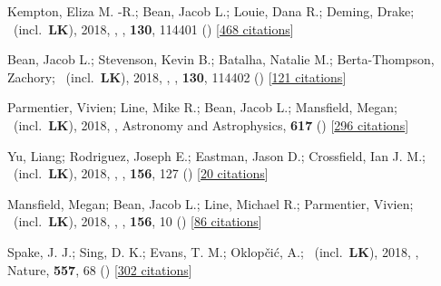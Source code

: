 \item[{\color{numcolor}\scriptsize24}] Kempton, Eliza M. -R.; Bean, Jacob L.; Louie, Dana R.; Deming, Drake; \etal\ (incl.\ \textbf{LK}), 2018, , \pasp, \textbf{130}, 114401 () [\href{https://ui.adsabs.harvard.edu/abs/2018PASP..130k4401K}{468 citations}]

\item[{\color{numcolor}\scriptsize23}] Bean, Jacob L.; Stevenson, Kevin B.; Batalha, Natalie M.; Berta-Thompson, Zachory; \etal\ (incl.\ \textbf{LK}), 2018, , \pasp, \textbf{130}, 114402 () [\href{https://ui.adsabs.harvard.edu/abs/2018PASP..130k4402B}{121 citations}]

\item[{\color{numcolor}\scriptsize22}] Parmentier, Vivien; Line, Mike R.; Bean, Jacob L.; Mansfield, Megan; \etal\ (incl.\ \textbf{LK}), 2018, , Astronomy and Astrophysics, \textbf{617} () [\href{https://ui.adsabs.harvard.edu/abs/2018A&A...617A.110P}{296 citations}]

\item[{\color{numcolor}\scriptsize21}] Yu, Liang; Rodriguez, Joseph E.; Eastman, Jason D.; Crossfield, Ian J. M.; \etal\ (incl.\ \textbf{LK}), 2018, , \aj, \textbf{156}, 127 () [\href{https://ui.adsabs.harvard.edu/abs/2018AJ....156..127Y}{20 citations}]

\item[{\color{numcolor}\scriptsize20}] Mansfield, Megan; Bean, Jacob L.; Line, Michael R.; Parmentier, Vivien; \etal\ (incl.\ \textbf{LK}), 2018, , \aj, \textbf{156}, 10 () [\href{https://ui.adsabs.harvard.edu/abs/2018AJ....156...10M}{86 citations}]

\item[{\color{numcolor}\scriptsize19}] Spake, J. J.; Sing, D. K.; Evans, T. M.; Oklop{\v{c}}i{\'c}, A.; \etal\ (incl.\ \textbf{LK}), 2018, , Nature, \textbf{557}, 68 () [\href{https://ui.adsabs.harvard.edu/abs/2018Natur.557...68S}{302 citations}]

